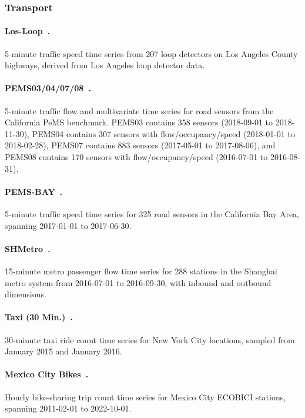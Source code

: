 \documentclass[11pt]{article}
\begin{document}
\subsubsection{Transport}

\paragraph{Los-Loop~\citep{jiang2023libcity}.}
5-minute traffic speed time series from 207 loop detectors on Los Angeles County highways, derived from Los Angeles loop detector data.

\paragraph{PEMS03/04/07/08~\citep{jiang2023libcity}.}
5-minute traffic flow and multivariate time series for road sensors from the California PeMS benchmark.
PEMS03 contains 358 sensors (2018-09-01 to 2018-11-30), PEMS04 contains 307 sensors with flow/occupancy/speed (2018-01-01 to 2018-02-28), PEMS07 contains 883 sensors (2017-05-01 to 2017-08-06), and PEMS08 contains 170 sensors with flow/occupancy/speed (2016-07-01 to 2016-08-31).

\paragraph{PEMS-BAY~\citep{jiang2023libcity}.}
5-minute traffic speed time series for 325 road sensors in the California Bay Area, spanning 2017-01-01 to 2017-06-30.

\paragraph{SHMetro~\citep{jiang2023libcity}.}
15-minute metro passenger flow time series for 288 stations in the Shanghai metro system from 2016-07-01 to 2016-09-30, with inbound and outbound dimensions.

\paragraph{Taxi (30 Min.)~\citep{alexandrov2020gluonts}.}
30-minute taxi ride count time series for New York City locations, sampled from January 2015 and January 2016.

\paragraph{Mexico City Bikes~\citep{ansarichronos}.}
Hourly bike-sharing trip count time series for Mexico City ECOBICI stations, spanning 2011-02-01 to 2022-10-01.
\end{document}
